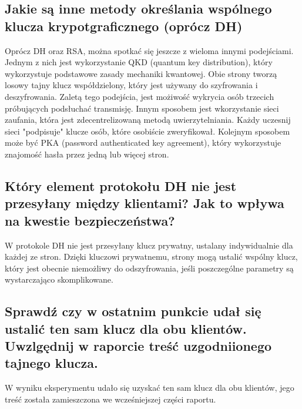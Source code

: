 \documentclass{article}
\begin{document}
\subsection{Jakie są inne metody określania wspólnego klucza krypotgraficznego (oprócz DH)}
Oprócz DH oraz RSA, można spotkać się jeszcze z wieloma innymi podejściami. Jednym z nich jest wykorzystanie QKD (quantum key distribution), który wykorzystuje podstawowe zasady mechaniki kwantowej. Obie strony
tworzą losowy tajny klucz współdzielony, który jest używany do szyfrowania i deszyfrowania. Zaletą tego podejścia, jest możiwość wykrycia osób trzecich próbujących podsłuchać transmisję. Innym sposobem jest wkorzystanie sieci zaufania, która jest zdecentrelizowaną
metodą uwierzytelniania. Każdy uczesnij sieci "podpisuje" klucze osób, które osobiście zweryfikował. Kolejnym sposobem może być PKA (password authenticated key agreement), który wykorzystuje znajomość hasła przez jedną lub więcej stron.
\subsection{Który element protokołu DH nie jest przesyłany między klientami? Jak to wpływa na kwestie bezpieczeństwa?}
W protokole DH nie jest przesyłany klucz prywatny, ustalany indywidualnie dla każdej ze stron. Dzięki kluczowi prywatnemu, strony mogą ustalić wspólny klucz, który jest obecnie niemożliwy do odszyfrowania,
jeśli poszczególne parametry są wystarczająco skomplikowane.
\subsection{Sprawdź czy w ostatnim punkcie udał się ustalić ten sam klucz dla obu klientów. Uwzlgędnij w raporcie treść uzgodniionego tajnego klucza.}
W wyniku eksperymentu udało się uzyskać ten sam klucz dla obu klientów, jego treść została zamieszczona we wcześniejszej części raportu.
\end{document}
